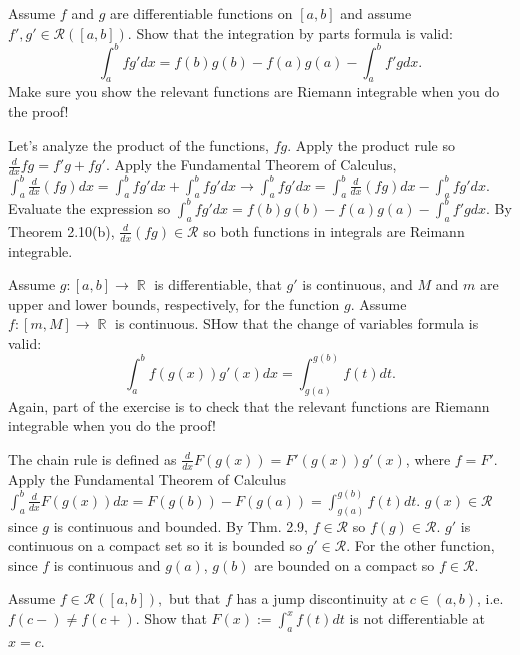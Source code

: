 \documentclass[12pt,letterpaper,boxed]{hmcpset}
\DeclareMathOperator{\R}{\mathbb{R}}
\begin{document}
\pagebreak
\begin{problem}[Exercise 2.16]
Assume $f$ and $g$ are differentiable functions on $[a,b]$ and assume $f', g' \in \mathcal{R}([a,b]).$ Show that the integration by parts formula is valid: $$\int_{a}^{b} fg'dx = f(b)g(b) - f(a)g(a) - \int_{a}^{b} f'gdx.$$ Make sure you show the relevant functions are Riemann integrable when you do the proof!
\end{problem}

\begin{solution}
Let's analyze the product of the functions, $fg$. Apply the product rule so $\frac{d}{dx}fg = f'g + fg'$. Apply the Fundamental Theorem of Calculus, $\int_{a}^{b} \frac{d}{dx}(fg)dx = \int_{a}^{b}fg'dx + \int_{a}^{b}fg'dx \rightarrow \int_{a}^{b}fg'dx = \int_{a}^{b}\frac{d}{dx}(fg) dx - \int_{a}^{b}fg'dx$. Evaluate the expression so $\int_{a}^{b}fg'dx = f(b)g(b) - f(a)g(a) - \int_{a}^{b}f'gdx$. By Theorem 2.10(b), $\frac{d}{dx}(fg) \in \mathcal{R}$ so both functions in integrals are Reimann integrable.
\end{solution}


\begin{problem}[Exercise 2.17]
Assume $g : [a, b] \rightarrow \R$ is differentiable, that $g'$ is continuous, and $M$ and $m$ are upper and lower bounds, respectively, for the function $g$. Assume $f : [m,M]\rightarrow\R$ is continuous. SHow that the change of variables formula is valid: $$\int_{a}^{b}f(g(x))g'(x)dx = \int_{g(a)}^{g(b)}f(t)dt.$$ Again, part of the exercise is to check that the relevant functions are Riemann integrable when you do the proof!
\end{problem}

\begin{solution}
The chain rule is defined as $\frac{d}{dx}F(g(x))= F'(g(x))g'(x)$, where $f = F'$. Apply the Fundamental Theorem of Calculus $\int_{a}^{b} \frac{d}{dx}F(g(x))dx = F(g(b)) - F(g(a)) = \int_{g(a)}^{g(b)} f(t)dt.$ $g(x)\in\mathcal{R}$ since $g$ is continuous and bounded. By Thm. 2.9, $f\in\mathcal{R}$ so $f(g)\in\mathcal{R}$. $g'$ is continuous on a compact set so it is bounded so $g'\in\mathcal{R}$. For the other function, since $f$ is continuous and $g(a)$, $g(b)$ are bounded on a compact so $f\in\mathcal{R}.$
\end{solution}

\begin{problem}[Exercise 2.18]
Assume $f \in \mathcal{R}([a,b]),$ but that $f$ has a jump discontinuity at $c \in (a,b)$, i.e. $f(c-)\neq f(c+).$ Show that $F(x) := \int_{a}^{x} f(t)dt$ is not differentiable at $x=c$.
\end{problem}
\end{document}
